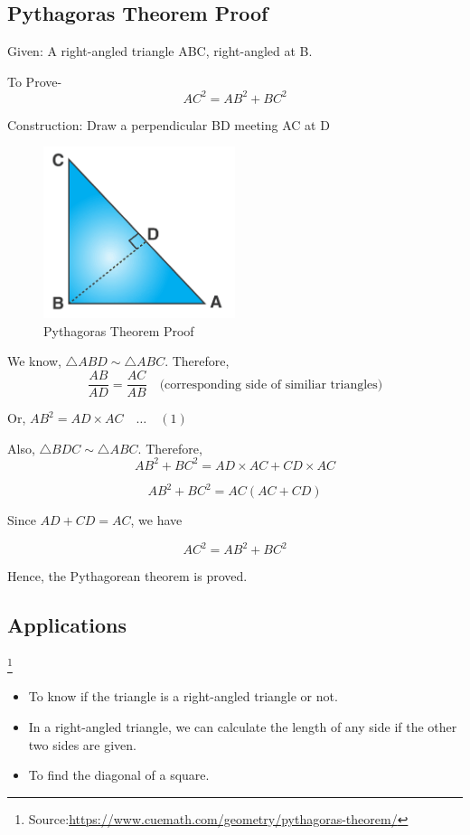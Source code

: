 \documentclass{article}
\begin{document}
\subsection*{Pythagoras Theorem Proof}

Given: A right-angled triangle ABC, right-angled at B.


To Prove-
\begin{equation}
    AC^2 \boldsymbol{=} AB^2 + BC^2
\end{equation}

Construction: Draw a perpendicular BD meeting AC at D

\begin{figure}
    \centering
    \includegraphics[width=0.5\textwidth]{P2.png}
    \caption{Pythagoras Theorem Proof}
    \label{fig:my_label2}
\end{figure}

We know, $\triangle ABD \sim \triangle ABC$. Therefore,
\[
\frac{AB}{AD} \boldsymbol{=} \frac{AC}{AB} \quad \text{(corresponding side of similiar triangles)}
\]

Or,
$AB^2 \boldsymbol{=} AD \times AC \quad \dots \quad (1)$ 

Also, $\triangle BDC \sim \triangle ABC$. Therefore,
\[
AB^2 + BC^2 \boldsymbol{=} AD \times AC + CD \times AC
\]

\[
AB^2 +BC^2 \boldsymbol{=} AC (AC + CD)
\]

Since $AD +CD \boldsymbol{=} AC$, we have

\[
AC^2 \boldsymbol{=} AB^2 + BC^2
\]

Hence, the Pythagorean theorem is proved.

\subsection*{Applications}\footnote{Source:\url{https://www.cuemath.com/geometry/pythagoras-theorem/}}

\begin{itemize}
        \item To know if the triangle is a right-angled triangle or not.
        \item In a right-angled triangle, we can calculate the length of any side if the other two sides are given.
        \item To find the diagonal of a square.
\end{itemize}
\end{document}
